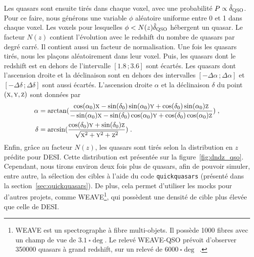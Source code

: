 Les quasars sont ensuite tirés dans chaque voxel, avec une probabilité $P \propto \hat \delta_{\textsc{QSO}}$. Pour ce faire, nous générons une variable $\phi$ aléatoire uniforme entre 0 et 1 dans chaque voxel. Les voxels pour lesquelles $\phi < N(z) \hat \delta_{\textsc{QSO}}$ hébergent un quasar.
Le facteur $N(z)$ contient l'évolution avec le redshift du nombre de quasars par degré carré. Il contient aussi un facteur de normalisation.
Une fois les quasars tirés, nous les plaçons aléatoirement dans leur voxel.
Puis, les quasars dont le redshift est en dehors de l'intervalle $[\num{1.8}\, ; \num{3.6}]$ sont écartés.
Les quasars dont l'ascension droite et la déclinaison sont en dehors des intervalles $[ - \Delta \alpha \, ; \Delta \alpha]$ et $[ - \Delta \delta \, ; \Delta \delta]$ sont aussi écartés.
L'ascension droite $\alpha$ et la déclinaison $\delta$ du point $(\textsc{x},\textsc{y},\textsc{z})$ sont données par
\begin{align}
  \label{eq:radec}
  \alpha &= \arctan(\frac{
  \cos(\alpha_0)\textsc{x} - \sin(\delta_0)\sin(\alpha_0)\textsc{y} + \cos(\delta_0)\sin(\alpha_0)\textsc{z}
  }{
  - \sin(\alpha_0)\textsc{x} - \sin(\delta_0)\cos(\alpha_0)\textsc{y} + \cos(\delta_0)\cos(\alpha_0)\textsc{z}
           }) \; ,\\
  \delta &= \arcsin(\frac{
           \cos(\delta_0)\textsc{y} + \sin(\delta_0) \textsc{z}
           }{
           \sqrt{\textsc{x}^2 + \textsc{y}^2 + \textsc{z}^2}
           }) \; .
\end{align}
Enfin, grâce au facteur $N(z)$, les quasars sont tirés selon la distribution en $z$ prédite pour DESI. Cette distribution est présentée sur la figure~\ref{fig:dndz_qso}. Cependant, nous tirons environ deux fois plus de quasars, afin de pouvoir simuler, entre autre, la sélection des cibles à l'aide du code \texttt{quickquasars} (présenté dans la section~\ref{sec:quickquasars}). De plus, cela permet d'utiliser les mocks pour d'autres projets, comme WEAVE\footnote{WEAVE est un spectrographe à fibre multi-objets. Il possède \num{1000} fibres avec un champ de vue de $\SI{3.1}{\square\deg}$. Le relevé WEAVE-QSO prévoit d'observer \num{350000} quasars à grand redshift, sur un relevé de $\SI{6000}{\square\deg}$~\autocite{Pieri2016}.}, qui possèdent une densité de cible plus élevée que celle de DESI.
